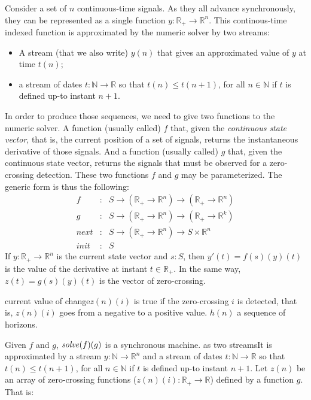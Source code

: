 \documentclass[11pt,titlepage,twoside]{report}
\newcommand{\bR}{\mathbb{R}}
\newcommand{\bN}{\mathbb{N}}
\begin{document}
Consider a set of $n$ continuous-time signals. As they all advance synchronously,
they can be represented as a single function $y: \bR_+ \rightarrow \bR^n$. 
This continous-time indexed function is approximated by the numeric solver
by two streams:
\begin{itemize}
\item
A stream (that we also write) $y(n)$ that gives an approximated value
of $y$ at time $t(n)$;
\item
a stream of dates $t: \bN \rightarrow \bR$ so that $t(n) \leq t(n+1)$,
for all $n \in \bN$ if $t$ is defined up-to instant $n+1$.
\end{itemize}
In order to produce those sequences, we need to give two functions to the
numeric solver. A function (usually called) $f$ that, given the \emph{continuous
state vector}, that is, the current position of a set of signals, returns the
instantaneous derivative of those signals. And a function (usually called) $g$
that, given the continuous state vector, returns the signals that must be observed
for a zero-crossing detection. These two functions $f$ and $g$ may be parameterized.
The generic form is thus the following:
\[
\begin{array}{lcl}
f & : & S \rightarrow (\bR_+ \rightarrow \bR^n) \rightarrow (\bR_+ \rightarrow \bR^n)
\\
g & : & S \rightarrow (\bR_+ \rightarrow \bR^n) \rightarrow (\bR_+ \rightarrow \bR^k)
\\
next & : & S \rightarrow (\bR_+ \rightarrow \bR^n) \rightarrow
                         S \times \bR^n
\\
init & : & S
\end{array}
\]
If $y: \bR_+ \rightarrow \bR^n$ is the current state vector and $s: S$,
then $y'(t) = f(s)(y)(t)$ is the value of the derivative at instant $t \in \bR_+$.
In the same way, $z(t) = g(s)(y)(t)$ is the vector of zero-crossing.

current value of  
change$z(n)(i)$
is true if the zero-crossing $i$ is detected, that is, $z(n)(i)$ goes
from a negative to a positive value. $h(n)$ a sequence of horizons.

Given $f$ and $g$, $\mathit{solve}({f})({g})$ is a synchronous machine.
as two streamsIt is approximated 
by a stream $y:\bN \rightarrow \bR^n$ and a stream of
dates $t: \bN \rightarrow \bR$ so that $t(n) \leq t(n+1)$, for all $n \in \bN$ if
$t$ is defined up-to instant $n+1$. Let $z(n)$ be an array of
zero-crossing functions ($z(n)(i): \bR_+ \rightarrow \bR$) defined by a function
$g$. That is:
\end{document}
